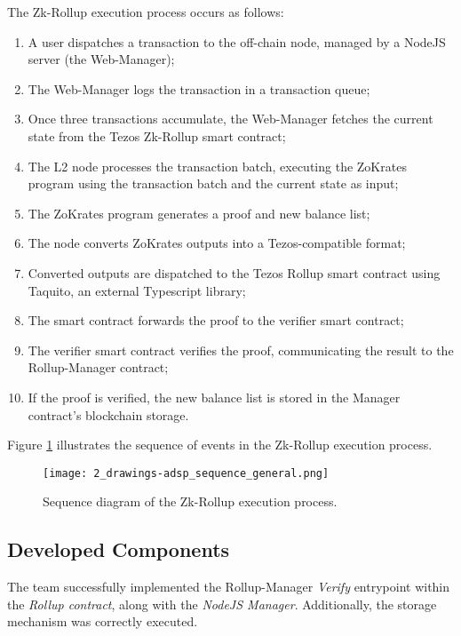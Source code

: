 The Zk-Rollup execution process occurs as follows:
\begin{enumerate}
    \item A user dispatches a transaction to the off-chain node, managed by a NodeJS server (the Web-Manager);
    \item The Web-Manager logs the transaction in a transaction queue;
    \item Once three transactions accumulate, the Web-Manager fetches the current state from the Tezos Zk-Rollup smart contract;
    \item The L2 node processes the transaction batch, executing the ZoKrates program using the transaction batch and the current state as input;
    \item The ZoKrates program generates a proof and new balance list;
    \item The node converts ZoKrates outputs into a Tezos-compatible format;
    \item Converted outputs are dispatched to the Tezos Rollup smart contract using Taquito, an external Typescript library;
    \item The smart contract forwards the proof to the verifier smart contract;
    \item The verifier smart contract verifies the proof, communicating the result to the Rollup-Manager contract;
    \item If the proof is verified, the new balance list is stored in the Manager contract's blockchain storage.
\end{enumerate}

Figure \ref{fig:2_drawings-adsp_sequence_general.png} illustrates the sequence of events in the Zk-Rollup execution process.

\begin{figure}[ht]
  \centering
  \texttt{[image: 2\_drawings-adsp\_sequence\_general.png]}
  \caption[Sequence Zk-Rollup]{Sequence diagram of the Zk-Rollup execution process.}  
  \label{fig:2_drawings-adsp_sequence_general.png}
\end{figure} 

\subsection{Developed Components}
The team successfully implemented the Rollup-Manager \textit{Verify} entrypoint within the \textit{Rollup contract}, along with the \textit{NodeJS Manager}. Additionally, the storage mechanism was correctly executed.

